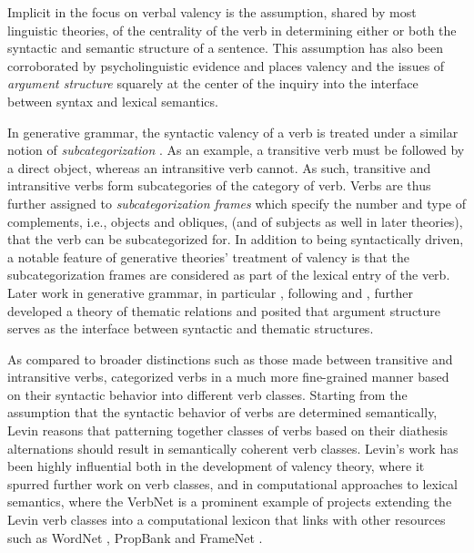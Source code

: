 Implicit in the focus on verbal valency is the assumption, shared by most linguistic theories, of the centrality of the verb in determining either or both the syntactic and semantic structure of a sentence. This assumption has also been corroborated by psycholinguistic evidence \citep{healy1970} and places valency and the issues of \textit{argument structure} squarely at the center of the inquiry into the interface between syntax and lexical semantics.

In generative grammar, the syntactic valency of a verb is treated under a similar notion of \textit{subcategorization} \citep{chomsky1965a}. As an example, a transitive verb must be followed by a direct object, whereas an intransitive verb cannot. As such, transitive and intransitive verbs form subcategories of the category of verb. Verbs are thus further assigned to \textit{subcategorization frames} which specify the number and type of complements, i.e., objects and obliques, (and of subjects as well in later theories), that the verb can be subcategorized for. In addition to being syntactically driven, a notable feature of generative theories' treatment of valency is that the subcategorization frames are considered as part of the lexical entry of the verb. Later work in generative grammar, in particular \citet{jackendoff1972,jackendoff1987,jackendoff1992}, following \citet{katz1963} and \citet{gruber1962}, further developed a theory of thematic relations and posited that argument structure serves as the interface between syntactic and thematic structures.

As compared to broader distinctions such as those made between transitive and intransitive verbs, \citet{levin1993} categorized verbs in a much more fine-grained manner based on their syntactic behavior into different verb classes. Starting from the assumption that the syntactic behavior of verbs are determined semantically, Levin reasons that patterning together classes of verbs based on their diathesis alternations should result in semantically coherent verb classes. Levin's work has been highly influential both in the development of valency theory, where it spurred further work on verb classes, and in computational approaches to lexical semantics, where the VerbNet \citep{kipper-schuler2005, kipper2006, kipper2008} is a prominent example of projects extending the Levin verb classes into a computational lexicon that links with other resources such as WordNet \citep{fellbaum1998, miller1995}, PropBank \citep{kingsbury2002} and FrameNet \citep{baker1998, fillmore2015}.

